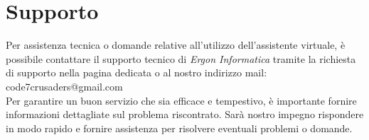 \section{Supporto}
Per assistenza tecnica o domande relative all'utilizzo dell'assistente virtuale, è possibile contattare il supporto tecnico di \textit{Ergon Informatica} tramite la richiesta di supporto nella pagina dedicata o al nostro indirizzo mail: \\ code7crusaders@gmail.com \\ Per garantire un buon servizio che sia efficace e tempestivo, è importante fornire informazioni dettagliate sul problema riscontrato. Sarà nostro impegno rispondere in modo rapido e fornire assistenza per risolvere eventuali problemi o domande.
